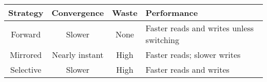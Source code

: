 \begin{table}[t]
    \small
    \center
    \begin{tabular}{@{}c|c|c|C{25mm}@{}}
        \textbf{Strategy} & \textbf{Convergence} & \textbf{Waste} & \textbf{Performance} \\
        \midrule
        Forward   & Slower         & None & Faster reads and writes unless switching
        \\\hline
        Mirrored  & Nearly instant & High & Faster reads; slower writes \\
        \hline
        Selective & Slower         & High & Faster reads and writes  \\
    \end{tabular}

\end{table}





